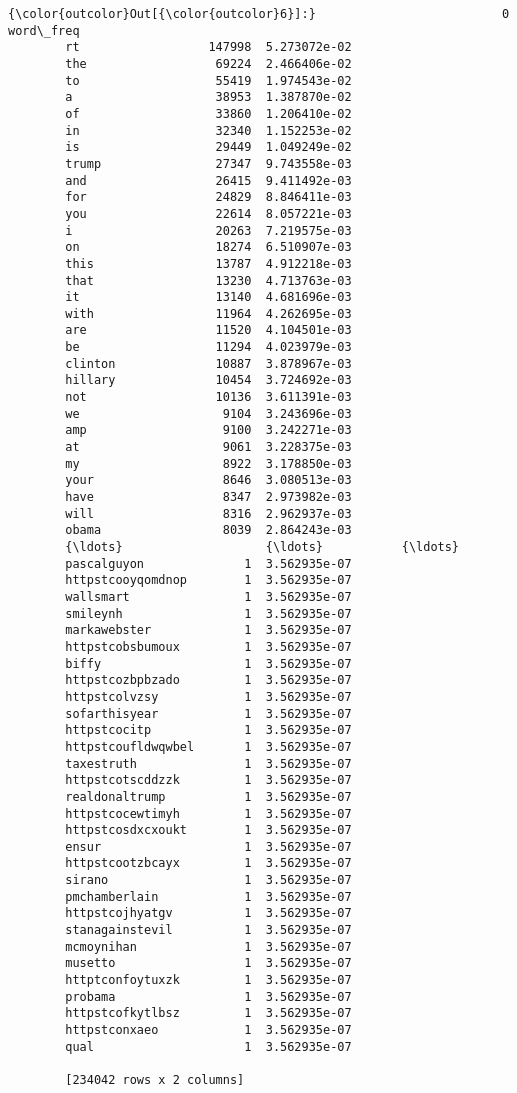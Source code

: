 \documentclass[11pt]{article}
\begin{document}
\begin{Verbatim}[commandchars=\\\{\}]
{\color{outcolor}Out[{\color{outcolor}6}]:}                          0     word\_freq
        rt                  147998  5.273072e-02
        the                  69224  2.466406e-02
        to                   55419  1.974543e-02
        a                    38953  1.387870e-02
        of                   33860  1.206410e-02
        in                   32340  1.152253e-02
        is                   29449  1.049249e-02
        trump                27347  9.743558e-03
        and                  26415  9.411492e-03
        for                  24829  8.846411e-03
        you                  22614  8.057221e-03
        i                    20263  7.219575e-03
        on                   18274  6.510907e-03
        this                 13787  4.912218e-03
        that                 13230  4.713763e-03
        it                   13140  4.681696e-03
        with                 11964  4.262695e-03
        are                  11520  4.104501e-03
        be                   11294  4.023979e-03
        clinton              10887  3.878967e-03
        hillary              10454  3.724692e-03
        not                  10136  3.611391e-03
        we                    9104  3.243696e-03
        amp                   9100  3.242271e-03
        at                    9061  3.228375e-03
        my                    8922  3.178850e-03
        your                  8646  3.080513e-03
        have                  8347  2.973982e-03
        will                  8316  2.962937e-03
        obama                 8039  2.864243e-03
        {\ldots}                    {\ldots}           {\ldots}
        pascalguyon              1  3.562935e-07
        httpstcooyqomdnop        1  3.562935e-07
        wallsmart                1  3.562935e-07
        smileynh                 1  3.562935e-07
        markawebster             1  3.562935e-07
        httpstcobsbumoux         1  3.562935e-07
        biffy                    1  3.562935e-07
        httpstcozbpbzado         1  3.562935e-07
        httpstcolvzsy            1  3.562935e-07
        sofarthisyear            1  3.562935e-07
        httpstcocitp             1  3.562935e-07
        httpstcoufldwqwbel       1  3.562935e-07
        taxestruth               1  3.562935e-07
        httpstcotscddzzk         1  3.562935e-07
        realdonaltrump           1  3.562935e-07
        httpstcocewtimyh         1  3.562935e-07
        httpstcosdxcxoukt        1  3.562935e-07
        ensur                    1  3.562935e-07
        httpstcootzbcayx         1  3.562935e-07
        sirano                   1  3.562935e-07
        pmchamberlain            1  3.562935e-07
        httpstcojhyatgv          1  3.562935e-07
        stanagainstevil          1  3.562935e-07
        mcmoynihan               1  3.562935e-07
        musetto                  1  3.562935e-07
        httptconfoytuxzk         1  3.562935e-07
        probama                  1  3.562935e-07
        httpstcofkytlbsz         1  3.562935e-07
        httpstconxaeo            1  3.562935e-07
        qual                     1  3.562935e-07
        
        [234042 rows x 2 columns]
\end{Verbatim}
            
\end{document}
